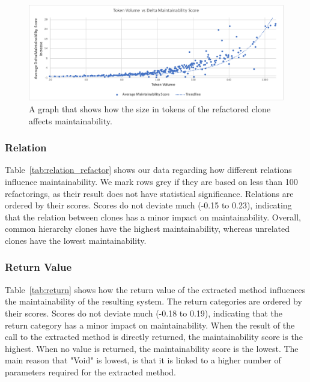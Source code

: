 \documentclass[a4paper,UKenglish,cleveref, autoref, thm-restate,authorcolumns]{lipics-v2019}
\begin{document}
\begin{figure}
  \includegraphics[width=1\textwidth]{img/tokenvolume}
  \caption{A graph that shows how the size in tokens of the refactored clone affects maintainability.}
  \label{fig:maintainabilityscore}
\end{figure}

\subsubsection{Relation}
Table~\ref{tab:relation_refactor} shows our data regarding how different relations influence maintainability. We mark rows grey if they are based on less than 100 refactorings, as their result does not have statistical significance. Relations are ordered by their scores. %
Scores do not deviate much (-0.15 to 0.23), indicating that the relation between clones has a minor impact on maintainability. Overall, common hierarchy clones have the highest maintainability, whereas unrelated clones have the lowest maintainability.

\subsubsection{Return Value}
Table~\ref{tab:return} shows how the return value of the extracted method influences the maintainability of the resulting system. The return categories are ordered by their scores. %
Scores do not deviate much (-0.18 to 0.19), indicating that the return category has a minor impact on maintainability. When the result of the call to the extracted method is directly returned, the maintainability score is the highest. When no value is returned, the maintainability score is the lowest. %
The main reason that "Void" is lowest, is that it is linked to a higher number of parameters required for the extracted method.
\end{document}
